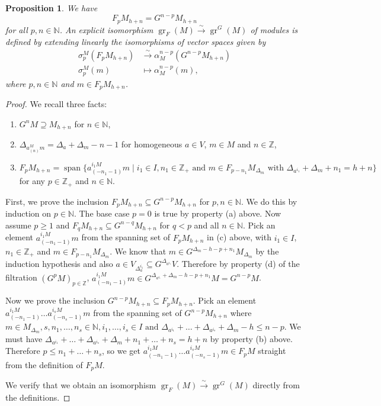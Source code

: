\documentclass[12pt, reqno]{amsart}
\newtheorem{proposition}[theorem]{Proposition}
\theoremstyle{remark}
\DeclareMathOperator{\gr}{gr}
\DeclareMathOperator{\vspan}{span}
\begin{document}
\begin{proposition}
  \label{prp:6}
  We have
  \begin{equation*}
    F_pM_{h + n} = G^{n - p}M_{h + n}
  \end{equation*}
  for all $p, n \in \mathbb{N}$.
  An explicit isomorphism $\gr_F(M) \xrightarrow{\sim} \gr^G(M)$ of modules is defined by extending linearly the isomorphisms of vector spaces given by
  \begin{align*}
    \sigma^M_p(F_pM_{h + n}) &\xrightarrow{\sim} \alpha^{n - p}_M(G^{n - p}M_{h + n}) \\
    \sigma^M_p(m) &\mapsto \alpha^{n - p}_M(m),
  \end{align*}
  where $p, n\in \mathbb{N}$ and $m \in F_pM_{h + n}$.
\end{proposition}

\begin{proof}
  We recall three facts:
  \begin{enumerate}[label={(\alph*)}]
  \item $G^nM \supseteq M_{h + n}$ for $n \in \mathbb{N}$,
  \item $\Delta_{a^M_{(n)}m} = \Delta_a + \Delta_m - n - 1$ for homogeneous $a \in V$, $m \in M$ and $n \in \mathbb{Z}$,
  \item $F_pM_{h + n} = \vspan\{a^{i_1M}_{(-n_1 - 1)}m \mid i_1 \in I, n_1 \in \mathbb{Z}_+\text{ and }m \in F_{p - n_1}M_{\Delta_m}\text{ with }\Delta_{a^{i_1}} + \Delta_m + n_1 = h + n\}$ for any $p \in \mathbb{Z}_+$ and $n \in \mathbb{N}$.
  \end{enumerate}
  First, we prove the inclusion $F_pM_{h + n} \subseteq G^{n - p}M_{h + n}$ for $p, n \in \mathbb{N}$.
  We do this by induction on $p \in \mathbb{N}$.
  The base case $p = 0$ is true by property (a) above.
  Now assume $p \ge 1$ and $F_qM_{h + n} \subseteq G^{n - q}M_{h + n}$ for $q < p$ and all $n \in \mathbb{N}$.
  Pick an element $a^{i_1M}_{(-n_1 - 1)}m$ from the spanning set of $F_pM_{h + n}$ in (c) above, with $i_1 \in I$, $n_1 \in \mathbb{Z}_+$ and $m \in F_{p - n_1}M_{\Delta_m}$.
  We know that $m \in G^{\Delta_m - h - p + n_1}M_{\Delta_m}$ by the induction hypothesis and also $a \in V_{\Delta_a^{i_1}} \subseteq G^{\Delta_{a^{i_1}}}V$.
  Therefore by property (d) of the filtration $(G^pM)_{p \in \mathbb{Z}}$, $a^{i_1M}_{(-n_1 - 1)}m \in G^{\Delta_{a^{i_1}} + \Delta_m - h - p + n_1}M = G^{n - p}M$.

  Now we prove the inclusion $G^{n - p}M_{h + n} \subseteq F_pM_{h + n}$.
  Pick an element $a^{i_1M}_{(-n_1 - 1)}\dots a^{i_sM}_{(-n_s - 1)}m$ from the spanning set of $G^{n - p}M_{h + n}$ where $m \in M_{\Delta_m}, s, n_1, \dots, n_s\in \mathbb{N}, i_1, \dots, i_s \in I\text{ and }\Delta_{a^{i_1}} + \dots + \Delta_{a^{i_s}} + \Delta_m - h \le n - p$.
  We must have $\Delta_{a^{i_1}} + \dots + \Delta_{a^{i_s}} + \Delta_m + n_1 + \dots + n_s = h + n$ by property (b) above.
  Therefore $p \le n_1 + \dots + n_s$, so we get $a^{i_1M}_{(-n_1 - 1)}\dots a^{i_sM}_{(-n_s - 1)}m \in F_pM$ straight from the definition of $F_pM$.

  We verify that we obtain an isomorphism $\gr_F(M) \xrightarrow{\sim} \gr^G(M)$ directly from the definitions.
\end{proof}
\end{document}
